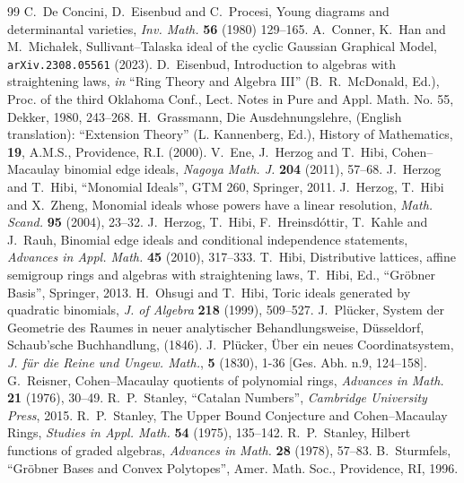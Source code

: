 \documentclass[12pt,a4paper]{amsart}
\theoremstyle{definition}
\begin{document}
\begin{thebibliography}{99}
C.~De Concini, D.~Eisenbud and C.~Procesi, Young diagrams and determinantal varieties, {\em Inv. Math.} {\bf 56} (1980) 129--165.
A.~Conner, K.~Han and M.~Michałek, Sullivant--{T}alaska ideal of the cyclic {G}aussian {G}raphical {M}odel, {\tt arXiv.2308.05561} (2023).
D.~Eisenbud, Introduction to algebras with straightening laws, {\em in} ``Ring Theory
and Algebra III'' (B.~R.~McDonald, Ed.), Proc. of the third Oklahoma Conf., Lect. Notes in Pure and Appl. Math. No. 55, Dekker, 1980, 243--268.
H.~Grassmann, Die Ausdehnungslehre, (English
translation): ``Extension Theory'' (L. Kannenberg, Ed.), History of Mathematics, {\bf 19}, A.M.S., Providence, R.I. (2000).
V.~Ene, J.~Herzog and T.~Hibi, Cohen--Macaulay binomial edge ideals, {\em Nagoya Math. J.} {\bf 204} (2011), 57--68. 
J.~Herzog and T.~Hibi, ``Monomial Ideals'', GTM 260, Springer, 2011.
J.~Herzog, T.~Hibi and X.~Zheng, Monomial ideals whose powers have a linear resolution, {\em Math. Scand.} {\bf 95} (2004), 23--32.
J.~Herzog, T.~Hibi, F.~Hreinsd\'ottir, T.~Kahle and J.~Rauh, Binomial edge ideals and conditional independence statements, {\em Advances in Appl. Math.} {\bf 45} (2010), 317--333.
T.~Hibi, Distributive lattices, affine semigroup rings and algebras with straightening laws, 
T.~Hibi, Ed., ``Gr\"obner Basis'', Springer, 2013. 
H.~Ohsugi and T.~Hibi, Toric ideals generated by quadratic binomials, {\em J. of Algebra} {\bf 218} (1999), 509--527.
J.~Plücker, System der Geometrie des Raumes in neuer analytischer Behandlungsweise, Düsseldorf, Schaub’sche Buchhandlung, (1846).
J.~Plücker, Über ein neues Coordinatsystem, {\em J. für die Reine und Ungew. Math.}, 
{\bf 5} (1830), 1-36 [Ges. Abh. n.9, 124–158].
G.~Reisner, Cohen--Macaulay quotients of polynomial rings, {\em Advances in Math.} {\bf 21} (1976), 30--49.
R.~P.~Stanley, ``Catalan Numbers'', {\em Cambridge University Press}, 2015.
R.~P.~Stanley, The Upper Bound Conjecture and Cohen--Macaulay Rings, {\em Studies
in Appl. Math.} {\bf 54} (1975), 135--142.
R.~P.~Stanley, Hilbert functions of graded algebras, {\em Advances in Math.} {\bf 28} (1978), 57--83.
B.~Sturmfels,  ``Gr\"obner Bases and Convex Polytopes'', Amer. Math. Soc., Providence, RI, 1996.
\end{thebibliography}
\end{document}
